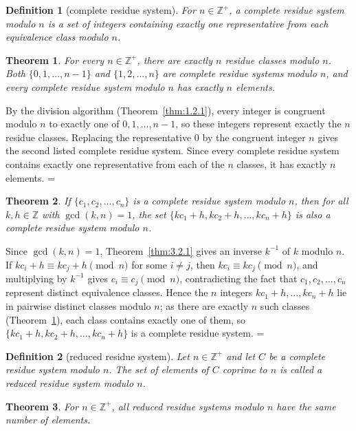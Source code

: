 \documentclass[11pt]{article}
\makeatletter
\theoremstyle{ntstyle}
\newtheorem{theorem}{Theorem}[subsection]
\newtheorem{definition}{Definition}[subsection]
\let\nt@closedisplay\]
\def\nt@guardedclose{\@ifnextchar\par{\nt@closeafterpar}{\@ifnextchar\end{\postdisplaypenalty\@M\nt@closedisplay}{\nt@closedisplay}}}
\def\nt@closeafterpar\par{\@ifnextchar\par{\nt@closeafterpar}{\@ifnextchar\end{\postdisplaypenalty\@M\nt@closedisplay\par}{\nt@closedisplay\par}}}
\renewenvironment{proof}[1][\proofname]{\par
  \pushQED{\qed}\normalfont\topsep\medskipamount\edef\nt@afterproof{\@endparpenalty=\the\@endparpenalty\relax}\@beginparpenalty\@M\@endparpenalty\@M\let\]\nt@guardedclose\trivlist\item[]\textit{#1\@addpunct{.}} \ignorespaces}{\ifvmode\addpenalty\@M\fi\popQED\nt@afterproof\endtrivlist\@endpefalse}
\makeatother
\begin{document}
\begin{definition}[complete residue system]\label{def:3.2.3} For $n\in\mathbb{Z}^+$, a
	complete residue system modulo $n$ is a set of integers containing
	exactly one representative from each equivalence class modulo $n$.
\end{definition}
\begin{theorem}\label{thm:3.2.4} For every $n\in\mathbb{Z}^+$, there are exactly $n$ residue
	classes modulo $n$. Both $\{0,1,\ldots,n-1\}$ and
	$\{1,2,\ldots,n\}$ are complete residue systems modulo $n$, and every
	complete residue system modulo $n$ has exactly $n$ elements.
\end{theorem}

\begin{proof} By the division algorithm (Theorem~\ref{thm:1.2.1}),
	every integer is congruent modulo $n$ to exactly one of
	$0,1,\ldots,n-1$, so these integers represent exactly the $n$ residue
	classes. Replacing the representative $0$ by the congruent integer $n$
	gives the second listed complete residue system. Since every complete
	residue system contains exactly one representative from each of the $n$
	classes, it has exactly $n$ elements.
\end{proof}
\begin{theorem}\label{thm:3.2.5} If $\{c_1, c_2, \ldots, c_n\}$ is a
	complete residue system modulo $n$, then for all $k, h \in
		\mathbb{Z}$ with $\gcd(k, n) = 1$, the set $\{k c_1 + h, k c_2 + h,
		\ldots, k c_n + h\}$ is also a complete residue system modulo $n$.
\end{theorem}

\begin{proof} Since $\gcd(k, n) = 1$, Theorem~\ref{thm:3.2.1} gives
	an inverse $k^{-1}$ of $k$ modulo $n$. If $k c_i + h \equiv k c_j + h
		\pmod{n}$ for some $i \neq j$, then $k c_i \equiv k c_j \pmod{n}$, and
	multiplying by $k^{-1}$ gives $c_i \equiv c_j \pmod{n}$, contradicting
	the fact that $c_1, c_2, \ldots, c_n$ represent distinct equivalence classes.
	Hence the $n$ integers $k c_1 + h, \ldots, k c_n + h$ lie in pairwise
	distinct classes modulo $n$; as there are exactly $n$ such classes
	(Theorem~\ref{thm:3.2.4}), each class contains exactly one of them, so
	$\{kc_1 + h, kc_2 + h, \ldots, kc_n + h\}$ is a complete residue
	system.
\end{proof}
\begin{definition}[reduced residue system]\label{def:3.2.4} Let $n\in\mathbb{Z}^+$ and let $C$
	be a complete residue system modulo $n$. The set of elements of $C$
	coprime to $n$ is called a
	reduced residue system modulo $n$.
\end{definition}
\begin{theorem}\label{thm:3.2.6} For $n\in\mathbb{Z}^+$, all reduced residue systems modulo $n$ have the same number
	of elements.
\end{theorem}
\end{document}
